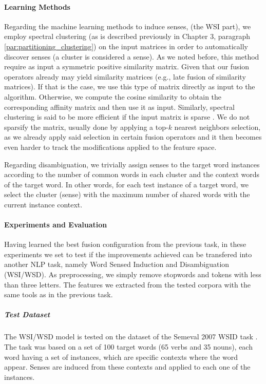 \paragraph{Learning Methods}
Regarding the machine learning methods to induce senses, (the WSI part), we employ spectral clustering (as is described previously in Chapter 3, paragraph \ref{par:partitioning_clustering}) on the input matrices in order to automatically discover senses (a cluster is considered a sense). As we noted before, this method require as input a symmetric positive similarity matrix. Given that our fusion operators already may yield similarity matrices (e.g., late fusion of similarity matrices). If that is the case, we use this type of matrix directly as input to the algorithm. Otherwise, we compute the cosine similarity to obtain the corresponding affinity matrix and then use it as input. Similarly, spectral clustering is said to be more efficient if the input matrix is sparse \cite{song2008parallel}. We do not sparsify the matrix, usually done by applying a top-$k$ nearest neighbors selection, as we already apply said selection in certain fusion operators and it then becomes even harder to track the modifications applied to the feature space.

 Regarding disambiguation, we trivially assign senses to the target word instances according to the number of common words in each cluster and the context words of the target word. In other words, for each test instance of a target word, we select the cluster (sense) with the maximum number of shared words with the current instance context.

\paragraph{Experiments and Evaluation}
Having learned the best fusion configuration from the previous task, in these experiments we set to test if the improvements achieved can be transfered into another NLP task, namely Word Sensed Induction and Disambiguation (WSI/WSD). As preprocessing, we simply remove stopwords and tokens with less than three letters. The features we extracted from the tested corpora with the same tools as in the previous task.
\subparagraph{Test Dataset}
The WSI/WSD model is tested on the dataset of  the Semeval 2007 WSID task \cite{Agirre2007}. The task was based on a set of 100 target words (65 verbs and 35 nouns), each  word having a set of instances, which are specific contexts where the word appear. Senses are induced from these contexts and applied to each one of the instances.

